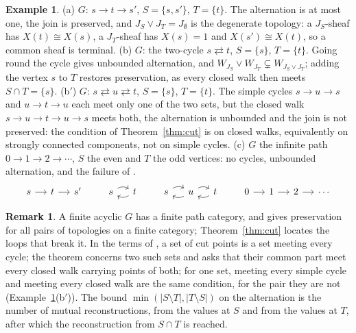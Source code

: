 \documentclass[11pt]{amsart}
\theoremstyle{definition}
\newtheorem{rem}[thm]{Remark}
\newtheorem{ex}[thm]{Example}
\begin{document}
\begin{ex}\label{ex:graphs}
(a) $G$: $s\to t\to s'$, $S=\{s,s'\}$, $T=\{t\}$. The alternation is at most
one, the join is preserved, and $J_S\vee J_T=J_\emptyset$ is the degenerate
topology: a $J_S$-sheaf has $X(t)\cong X(s)$, a $J_T$-sheaf has
$X(s)=1$ and $X(s')\cong X(t)$, so a common sheaf is terminal.
(b) $G$: the two-cycle $s\rightleftarrows t$, $S=\{s\}$, $T=\{t\}$. Going
round the cycle gives unbounded alternation, and $W_{J_S}\vee
W_{J_T}\subsetneq W_{J_S\vee J_T}$; adding the vertex $s$ to $T$ restores
preservation, as every closed walk then meets $S\cap T=\{s\}$.
(b$'$) $G$: $s\rightleftarrows u\rightleftarrows t$, $S=\{s\}$, $T=\{t\}$.
The simple cycles $s\to u\to s$ and $u\to t\to u$ each meet only one of
the two sets, but the closed walk $s\to u\to t\to u\to s$ meets both,
the alternation is unbounded and the join is not preserved: the condition
of Theorem~\ref{thm:cut} is on closed walks, equivalently on strongly
connected components, not on simple cycles.
(c) $G$ the infinite path $0\to1\to2\to\cdots$, $S$ the even and $T$ the
odd vertices: no cycles, unbounded alternation, and the failure of
\cite{Topjoin}.
\[
\begin{tikzcd}[column sep=small]
s\arrow[r] & t\arrow[r] & s'
\end{tikzcd}
\qquad
\begin{tikzcd}[column sep=small]
s\arrow[r,bend left] & t\arrow[l,bend left]
\end{tikzcd}
\qquad
\begin{tikzcd}[column sep=small]
s\arrow[r,bend left] & u\arrow[l,bend left]\arrow[r,bend left] &
t\arrow[l,bend left]
\end{tikzcd}
\qquad
\begin{tikzcd}[column sep=small]
0\arrow[r] & 1\arrow[r] & 2\arrow[r] & \cdots
\end{tikzcd}
\]
\end{ex}

\begin{rem}
A finite acyclic $G$ has a finite path category, and \cite{Finitejoin}
gives preservation for all pairs of topologies on a finite category;
Theorem~\ref{thm:cut} locates the loops that break it. In the terms of
\cite{Bourdoncle}, a set of cut points is a set meeting every cycle; the
theorem concerns two such sets and asks that their common part meet every
closed walk carrying points of both; for one set, meeting every simple
cycle and meeting every closed walk are the same condition, for the pair
they are not (Example~\ref{ex:graphs}(b$'$)). The bound
$\min(|S\setminus T|,|T\setminus S|)$ on the alternation is the number of
mutual reconstructions, from the values at $S$ and from the
values at $T$, after which the reconstruction from $S\cap T$ is reached.
\end{rem}
\end{document}
